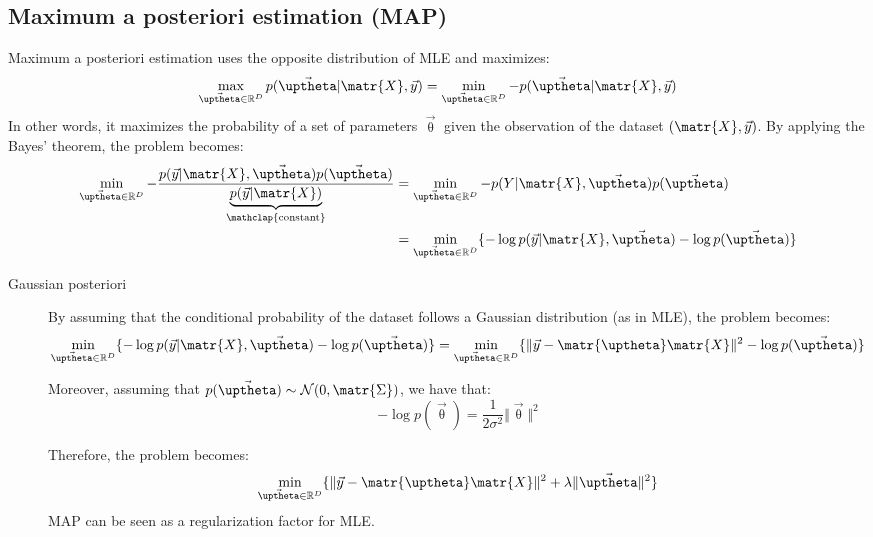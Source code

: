 \subsection{Maximum a posteriori estimation (MAP)}
Maximum a posteriori estimation uses the opposite distribution of MLE and maximizes:
\[ 
    \max_{\vec{\uptheta} \in \mathbb{R}^D} p(\vec{\uptheta} \vert \matr{X}, \vec{y}) =
    \min_{\vec{\uptheta} \in \mathbb{R}^D} -p(\vec{\uptheta} \vert \matr{X}, \vec{y})
\]
In other words, it maximizes the probability of a set of parameters $\vec{\uptheta}$ given the observation of the dataset $(\matr{X}, \vec{y})$.
By applying the Bayes' theorem, the problem becomes:
\[ 
    \begin{split}
        \min_{\vec{\uptheta} \in \mathbb{R}^D} 
            -\frac{p(\vec{y} \vert \matr{X}, \vec{\uptheta}) p(\vec{\uptheta})}{\underbrace{p(\vec{y} \vert \matr{X})}_{\mathclap{\text{constant}}}} &=
        \min_{\vec{\uptheta} \in \mathbb{R}^D} -p(Y \vert \matr{X}, \vec{\uptheta}) p(\vec{\uptheta}) \\
        &= \min_{\vec{\uptheta} \in \mathbb{R}^D} \{ -\log p(\vec{y} \vert \matr{X}, \vec{\uptheta}) -\log p(\vec{\uptheta}) \}
    \end{split}
\]

\begin{description}
    \item[Gaussian posteriori] 
        By assuming that the conditional probability of the dataset follows a Gaussian distribution (as in MLE),
        the problem becomes:
        \[ 
            \min_{\vec{\uptheta} \in \mathbb{R}^D} \{ -\log p(\vec{y} \vert \matr{X}, \vec{\uptheta}) -\log p(\vec{\uptheta}) \} = 
            \min_{\vec{\uptheta} \in \mathbb{R}^D} \{ \Vert \vec{y} - \matr{\uptheta}\matr{X} \Vert^2 -\log p(\vec{\uptheta}) \} 
        \]

        Moreover, assuming that $p(\vec{\uptheta}) \sim \mathcal{N}(0, \matr{\Sigma})$, we have that:
        \[ -\log p(\vec{\uptheta}) = \frac{1}{2\sigma^2} \Vert \vec{\uptheta} \Vert^2 \]

        Therefore, the problem becomes:
        \[ \min_{\vec{\uptheta} \in \mathbb{R}^D} \{ \Vert \vec{y} - \matr{\uptheta}\matr{X} \Vert^2 + \lambda \Vert \vec{\uptheta} \Vert^2 \} \]
        MAP can be seen as a regularization factor for MLE.
\end{description}



